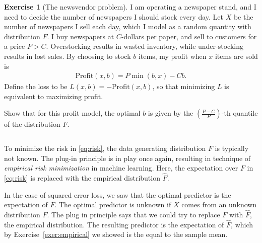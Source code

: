 \documentclass[11pt]{article}
\theoremstyle{definition}
\newtheorem{exercise}[]{Exercise}
\begin{document}
\begin{exercise}[The newsvendor problem]
  I am operating a newspaper stand, and I need to decide the number of newspapers
  I should stock every day.
  Let $X$ be the number of newspapers I sell each day, which I model as
  a random quantity with
  distribution $F$.
  I buy newspapers at $C$-dollars per paper, and sell to customers for a price $P > C$.
  Overstocking results in wasted inventory, while under-stocking results in lost sales.
  By choosing to stock $b$ items, my profit when $x$ items
  are sold is
  \begin{align}
    \textrm{Profit}(x, b) = P\min(b, x) - Cb.
  \end{align}
  Define the loss to be $L(x, b) = - \textrm{Profit}(x, b)$, so that
  minimizing $L$ is equivalent to maximizing profit.

  Show that for this profit model, the optimal $b$ is given by the $(\frac{P - C}{P})$-th
  quantile of the distribution $F$.

\end{exercise}

$\quad$

To minimize the risk in \eqref{eq:risk}, the data generating distribution
$F$ is typically not known.
The plug-in principle is in play once again, resulting in technique of
\textit{empirical risk minimization} in machine learning.
Here, the expectation over $F$ in \eqref{eq:risk} is replaced with the empirical
distribution $\hat F$.

In the case of squared error loss, we saw that the optimal predictor is the
expectation of $F$.
The optimal predictor is unknown if $X$ comes from an unknown distribution $F$.
The plug in principle says that we could try to replace $F$ with $\hat F$,
the empirical distribution.
The resulting predictor is the expectation of $\hat F$, which by
Exercise~\ref{exer:empirical} we showed is the equal to the sample mean.
\end{document}
